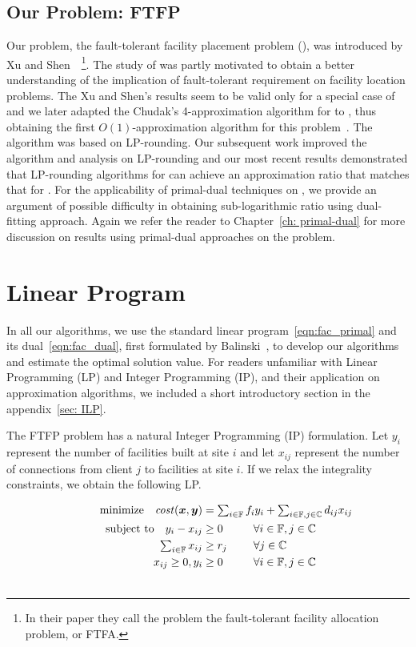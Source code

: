 \documentclass[oneside,final]{ucr}
\begin{document}
\section{Our Problem: FTFP}
Our problem, the fault-tolerant facility placement problem
(\FTFP), was introduced by Xu and
Shen~\cite{XuS09}~\footnote{In their paper they call the
  problem the fault-tolerant facility allocation problem, or
  FTFA.}. The study of {\FTFP} was partly motivated to
obtain a better understanding of the implication of
fault-tolerant requirement on facility location
problems. The Xu and Shen's results seem to be valid only
for a special case of {\FTFP} and we later adapted the
Chudak's 4-approximation algorithm for {\UFL} to {\FTFP},
thus obtaining the first $O(1)$-approximation algorithm for
this problem~\cite{YanC11}. The algorithm was based on
LP-rounding. Our subsequent work improved the algorithm and
analysis on LP-rounding and our most recent results
demonstrated that LP-rounding algorithms for {\FTFP} can
achieve an approximation ratio that matches that for
{\UFL}. For the applicability of primal-dual techniques on
{\FTFP}, we provide an argument of possible difficulty in
obtaining sub-logarithmic ratio using dual-fitting
approach. Again we refer the reader to Chapter~\ref{ch:
  primal-dual} for more discussion on results using
primal-dual approaches on the {\FTFP} problem.

\chapter{Linear Program} \label{ch:lp} 

In all our algorithms, we use the standard linear
program~\ref{eqn:fac_primal} and its
dual~\ref{eqn:fac_dual}, first formulated by
Balinski~\cite{Bal66}, to develop our algorithms and
estimate the optimal solution value. For readers unfamiliar
with Linear Programming (LP) and Integer Programming (IP),
and their application on approximation algorithms, we
included a short introductory section in the
appendix~\ref{sec: ILP}.

The FTFP problem has a natural Integer Programming (IP)
formulation. Let $y_i$ represent the number of facilities
built at site $i$ and let $x_{ij}$ represent the number of
connections from client $j$ to facilities at site $i$. If we
relax the integrality constraints, we obtain the following
LP.

\begin{alignat}{3}
  \textrm{minimize} \quad \cost(\bfx,\bfy) &= \textstyle{\sum_{i\in \sitesset}f_iy_i 
								+ \sum_{i\in \sitesset, j\in \clientset}d_{ij}x_{ij}}\label{eqn:fac_primal}\hspace{-1.5in}&&
									\\ \notag
  \textrm{subject to}\quad y_i - x_{ij} &\geq 0 			&\quad 		&\forall i\in \sitesset, j\in \clientset 
									\\ \notag
     \textstyle{\sum_{i\in \sitesset} x_{ij}} &\geq r_j  &			&\forall j\in \clientset
 									\\ \notag
  	  x_{ij} \geq 0, y_i &\geq 0 						& 			&\forall i\in \sitesset, j\in \clientset 
  									\\ \notag
\end{alignat}
\end{document}
